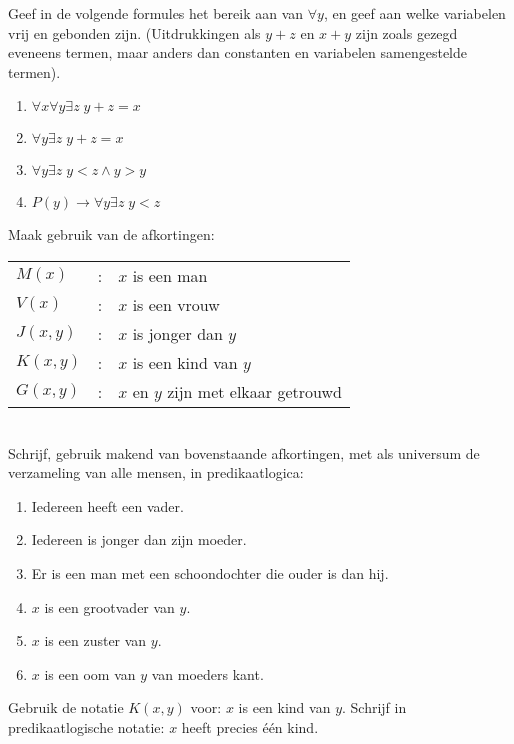 \begin{exercise}
Geef in de volgende formules het bereik aan van $\forall y$, en geef aan welke variabelen vrij en gebonden zijn. (Uitdrukkingen als $y+z$ en $x+y$ zijn zoals gezegd eveneens termen, maar anders dan constanten en variabelen samengestelde termen).
\begin{enumerate}[label=\roman*.]
    \item $\forall x\forall y\exists z\;y+z=x$
    \item $\forall y\exists z\;y+z=x$
    \item $\forall y\exists z\;y<z\wedge y>y$
    \item $P(y)\rightarrow\forall y\exists z\;y<z$
\end{enumerate}
\end{exercise}

\begin{exercise}
Maak gebruik van de afkortingen:

\begin{tabular}{lcl}
$M(x)$&:&$x$ is een man\\
$V(x)$&:&$x$ is een vrouw\\
$J(x,y)$&:&$x$ is jonger dan $y$\\
$K(x,y)$&:&$x$ is een kind van $y$\\
$G(x,y)$&:&$x$ en $y$ zijn met elkaar getrouwd
\end{tabular}\\
Schrijf, gebruik makend van bovenstaande afkortingen, met als universum de verzameling van alle mensen, in predikaatlogica:
\begin{enumerate}[label=\arabic*.]
    \item Iedereen heeft een vader.
    \item Iedereen is jonger dan zijn moeder.
    \item Er is een man met een schoondochter die ouder is dan hij.
    \item $x$ is een grootvader van $y$.
    \item $x$ is een zuster van $y$.
    \item $x$ is een oom van $y$ van moeders kant.
\end{enumerate}
\end{exercise}

\begin{exercise}
Gebruik de notatie $K(x,y)$ voor: $x$ is een kind van $y$. Schrijf in predikaatlogische notatie: $x$ heeft precies \'e\'en kind.
\end{exercise}

